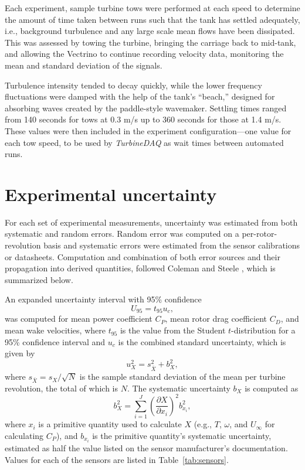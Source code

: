 Each experiment, sample turbine tows were performed at each speed to determine
the amount of time taken between runs such that the tank has settled adequately,
i.e., background turbulence and any large scale mean flows have been dissipated.
This was assessed by towing the turbine, bringing the carriage back to mid-tank,
and allowing the Vectrino to continue recording velocity data, monitoring the
mean and standard deviation of the signals. 

Turbulence intensity tended to decay quickly, while the lower frequency
fluctuations were damped with the help of the tank's ``beach,'' designed for
absorbing waves created by the paddle-style wavemaker. Settling times ranged
from 140 seconds for tows at 0.3 m/s up to 360 seconds for those at 1.4 m/s.
These values were then included in the experiment configuration---one value for
each tow speed, to be used by \textit{TurbineDAQ} as wait times between
automated runs.


\section{Experimental uncertainty}\label{sec:uncertainty}

For each set of experimental measurements, uncertainty was estimated from both
systematic and random errors. Random error was computed on a
per-rotor-revolution basis and systematic errors were estimated from the sensor
calibrations or datasheets. Computation and combination of both error sources
and their propagation into derived quantities, followed Coleman and Steele
\cite{ColemanSteele}, which is summarized below.

An expanded uncertainty interval with 95\% confidence
\begin{equation}
    U_{95} = t_{95} u_c,
\end{equation}
was computed for mean power coefficient $C_P$, mean rotor drag coefficient
$C_D$, and mean wake velocities, where $t_{95}$ is the value from the Student
$t$-distribution for a 95\% confidence interval and $u_c$ is the combined
standard uncertainty, which is given by
\begin{equation}
    u_X^2 = s_{\bar{X}}^2 + b_X^2,
\end{equation}
where $s_{\bar{X}} = s_X/\sqrt{N}$ is the sample standard deviation of the mean
per turbine revolution, the total of which is $N$. The systematic uncertainty
$b_X$ is computed as
\begin{equation}
    b_{X}^2 = \sum_{i=1}^J \left( \frac{\partial X}{\partial x_i} \right)^2
    b_{x_i}^2,
\end{equation}
where $x_i$ is a primitive quantity used to calculate $X$ (e.g., $T$, $\omega$,
and $U_\infty$ for calculating $C_P$), and $b_{x_i}$ is the primitive quantity's
systematic uncertainty, estimated as half the value listed on the sensor
manufacturer's documentation. Values for each of the sensors are listed in
Table~\ref{tab:sensors}.

